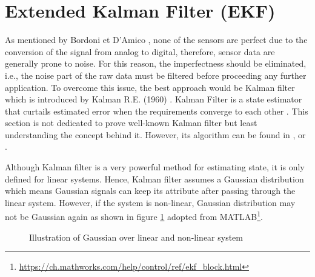 \section{Extended Kalman Filter (EKF)}\label{ekf}
As mentioned by Bordoni et D'Amico \cite{noise}, none of the sensors are perfect due to the conversion of the signal from analog to digital, therefore, sensor data are generally prone to noise. For this reason, the imperfectness should be eliminated, i.e., the noise part of the raw data must be filtered before proceeding any further application. To overcome this issue, the best approach would be Kalman filter which is introduced by Kalman R.E. (1960) \cite{kalman}. Kalman Filter is a state estimator that curtails estimated error when the requirements converge to each other \cite{kalman1}. This section is not dedicated to prove well-known Kalman filter but least understanding the concept behind it. However, its algorithm can be found in \cite{kalman}, \cite{kalman1} or \cite{kalman2}. \par Although Kalman filter is a very powerful method for estimating state, it is only defined for linear systems. Hence, Kalman filter assumes a Gaussian distribution which means Gaussian signals can keep its attribute after passing through the linear system. However, if the system is non-linear, Gaussian distribution may not be Gaussian again as shown in figure \ref{fig:Gaussion} adopted from MATLAB\footnote{\url{https://ch.mathworks.com/help/control/ref/ekf_block.html}}.
\vspace{-0,5cm}
\begin{figure}[H]
\centering
{}
\hfill
{}
\caption{Illustration of Gaussian over linear and non-linear system }
\label{fig:Gaussion}
\end{figure}

